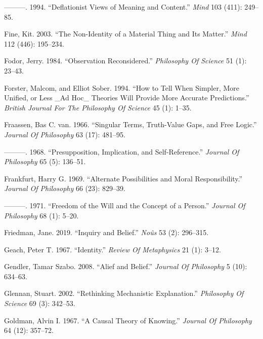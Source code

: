 \documentclass[
  10pt,
  letterpaper,
  DIV=11,
  numbers=noendperiod,
  twoside]{scrartcl}
\newlength{\cslhangindent}
\newenvironment{CSLReferences}[2] %
 {\begin{list}{}{%
  \setlength{\itemindent}{0pt}
  \setlength{\leftmargin}{0pt}
  \setlength{\parsep}{0pt}
  \ifodd #1
   \setlength{\leftmargin}{\cslhangindent}
   \setlength{\itemindent}{-1\cslhangindent}
  \fi
  \setlength{\itemsep}{#2\baselineskip}}}
 {\end{list}}
\begin{document}
\begin{CSLReferences}{1}{0}
---------. 1994. {``Deflationist Views of Meaning and Content.''}
\emph{Mind} 103 (411): 249--85.

Fine, Kit. 2003. {``The Non-Identity of a Material Thing and Its
Matter.''} \emph{Mind} 112 (446): 195--234.

Fodor, Jerry. 1984. {``Observation Reconsidered.''} \emph{Philosophy Of
Science} 51 (1): 23--43.

Forster, Malcom, and Elliot Sober. 1994. {``How to Tell When Simpler,
More Unified, or Less \_Ad Hoc\_ Theories Will Provide More Accurate
Predictions.''} \emph{British Journal For The Philosophy Of Science} 45
(1): 1--35.

Fraassen, Bas C. van. 1966. {``Singular Terms, Truth-Value Gaps, and
Free Logic.''} \emph{Journal Of Philosophy} 63 (17): 481--95.

---------. 1968. {``Presupposition, Implication, and Self-Reference.''}
\emph{Journal Of Philosophy} 65 (5): 136--51.

Frankfurt, Harry G. 1969. {``Alternate Possibilities and Moral
Responsibility.''} \emph{Journal Of Philosophy} 66 (23): 829--39.

---------. 1971. {``Freedom of the Will and the Concept of a Person.''}
\emph{Journal Of Philosophy} 68 (1): 5--20.

Friedman, Jane. 2019. {``Inquiry and Belief.''} \emph{Noûs} 53 (2):
296--315.

Geach, Peter T. 1967. {``Identity.''} \emph{Review Of Metaphysics} 21
(1): 3--12.

Gendler, Tamar Szabo. 2008. {``Alief and Belief.''} \emph{Journal Of
Philosophy} 5 (10): 634--63.

Glennan, Stuart. 2002. {``Rethinking Mechanistic Explanation.''}
\emph{Philosophy Of Science} 69 (3): 342--53.

Goldman, Alvin I. 1967. {``A Causal Theory of Knowing.''} \emph{Journal
Of Philosophy} 64 (12): 357--72.


\end{CSLReferences}
\end{document}
